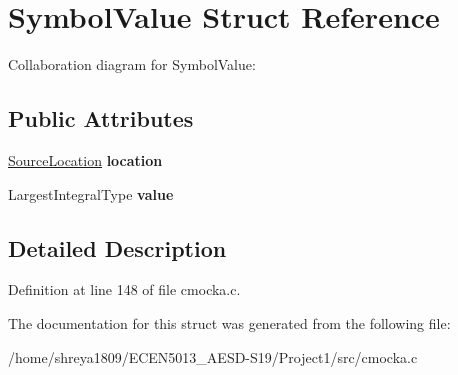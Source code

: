 \hypertarget{structSymbolValue}{}\section{Symbol\+Value Struct Reference}
\label{structSymbolValue}


Collaboration diagram for Symbol\+Value\+:
\subsection*{Public Attributes}
\begin{DoxyCompactItemize}
\item 
\mbox{\label{structSymbolValue_a9d841d4c3b663a12c9bf0056d6664b41}} 
\hyperlink{structSourceLocation}{Source\+Location} {\bfseries location}
\item 
\mbox{\label{structSymbolValue_aaa77effaf2204ad1b18f6a2379590750}} 
Largest\+Integral\+Type {\bfseries value}
\end{DoxyCompactItemize}


\subsection{Detailed Description}


Definition at line 148 of file cmocka.\+c.



The documentation for this struct was generated from the following file\+:\begin{DoxyCompactItemize}
\item 
/home/shreya1809/\+E\+C\+E\+N5013\+\_\+\+A\+E\+S\+D-\/\+S19/\+Project1/src/cmocka.\+c\end{DoxyCompactItemize}
